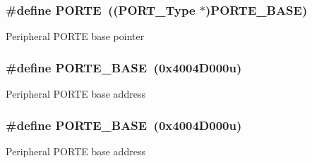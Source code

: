 \subsubsection[{\texorpdfstring{P\+O\+R\+TE}{PORTE}}]{\setlength{\rightskip}{0pt plus 5cm}\#define P\+O\+R\+TE~(({\bf P\+O\+R\+T\+\_\+\+Type} $\ast$){\bf P\+O\+R\+T\+E\+\_\+\+B\+A\+SE})}\hypertarget{group__PORT__Peripheral__Access__Layer_ga7e2386d3b1084b5b875ae3696f550ba9}{}\label{group__PORT__Peripheral__Access__Layer_ga7e2386d3b1084b5b875ae3696f550ba9}
Peripheral P\+O\+R\+TE base pointer 
\subsubsection[{\texorpdfstring{P\+O\+R\+T\+E\+\_\+\+B\+A\+SE}{PORTE_BASE}}]{\setlength{\rightskip}{0pt plus 5cm}\#define P\+O\+R\+T\+E\+\_\+\+B\+A\+SE~(0x4004\+D000u)}\hypertarget{group__PORT__Peripheral__Access__Layer_ga72d490d67d751071845b3532193b4b93}{}\label{group__PORT__Peripheral__Access__Layer_ga72d490d67d751071845b3532193b4b93}
Peripheral P\+O\+R\+TE base address 
\subsubsection[{\texorpdfstring{P\+O\+R\+T\+E\+\_\+\+B\+A\+SE}{PORTE_BASE}}]{\setlength{\rightskip}{0pt plus 5cm}\#define P\+O\+R\+T\+E\+\_\+\+B\+A\+SE~(0x4004\+D000u)}\hypertarget{group__PORT__Peripheral__Access__Layer_ga72d490d67d751071845b3532193b4b93}{}\label{group__PORT__Peripheral__Access__Layer_ga72d490d67d751071845b3532193b4b93}
Peripheral P\+O\+R\+TE base address 